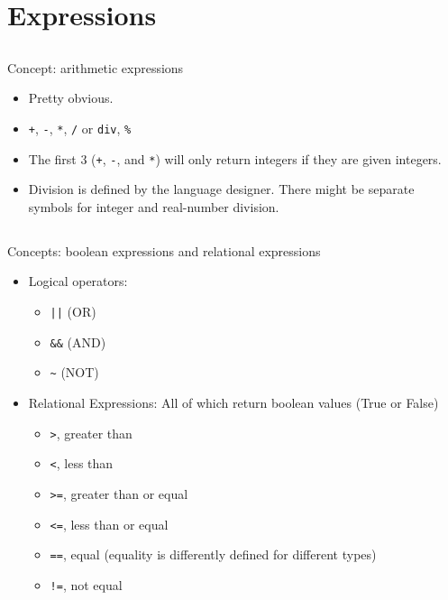\section{Expressions}\label{sec:Expressions}

\subsection{}
Concept: arithmetic expressions

\begin{itemize}[noitemsep]
\item Pretty obvious.
\item \texttt{+}, \texttt{-}, \texttt{*}, \texttt{/} or \texttt{div}, \texttt{\%}
\item The first 3 (\texttt{+}, \texttt{-}, and \texttt{*}) will only return integers if they are given integers.
\item Division is defined by the language designer. There might be separate symbols for integer and real-number division.
\end{itemize}

\subsection{}
Concepts: boolean expressions and relational expressions

\begin{itemize}
\item Logical operators:
  \begin{itemize}[noitemsep]
  \item \texttt{||} (OR)
  \item \texttt{\&\&} (AND)
  \item \texttt{\textasciitilde} (NOT)
  \end{itemize}

\item Relational Expressions: All of which return boolean values (True or False)
  \begin{itemize}[noitemsep]
  \item \texttt{>}, greater than
  \item \texttt{<}, less than
  \item \texttt{>=}, greater than or equal
  \item \texttt{<=}, less than or equal
  \item \texttt{==}, equal (equality is differently defined for different types)
  \item \texttt{!=}, not equal
  \end{itemize}
\end{itemize}


